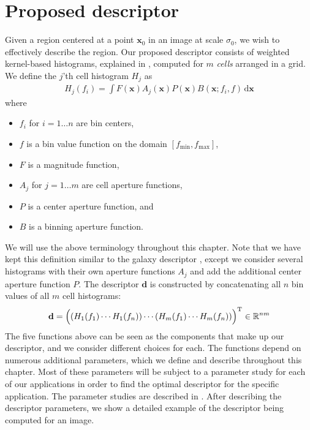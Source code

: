 \documentclass[thesis.tex]{subfiles}
\def\x{\mathbf{x}}
\def\d{\mathbf{d}}
\begin{document}
\chapter{Proposed descriptor}
%
Given a region centered at a point $\x_0$ in an image at scale $\sigma_0$, we wish to effectively describe the region. Our proposed descriptor consists of weighted kernel-based histograms, explained in , computed for $m$ \textit{cells} arranged in a grid. We define the $j$'th cell histogram $H_j$ as
%
\begin{align}
\label{eq:proposed_histogram}
H_j(f_i) = \int F(\x) A_j (\x) P (\x) B(\x; f_i,f) \,\text{d} \x
\end{align}
%
where
%
\begin{itemize}
\item[] $f_i$ for $i = 1 \dots n$ are bin centers,
\item[] $f$ is a bin value function on the domain $[f_\text{min},f_\text{max}]$,
\item[] $F$ is a magnitude function,
\item[] $A_j$ for $j = 1 \dots m$ are cell aperture functions,
\item[] $P$ is a center aperture function, and
\item[] $B$ is a binning aperture function.
\end{itemize}
%
We will use the above terminology throughout this chapter. Note that we have kept this definition similar to the galaxy descriptor \cite{pedersen2013shape}, except we consider several histograms with their own aperture functions $A_j$ and add the additional center aperture function $P$. The descriptor $\d$ is constructed by concatenating all $n$ bin values of all $m$ cell histograms:
%
\begin{align}
\label{eq:proposed_descriptor}
\d = \Bigl( \left(H_1(f_1) \cdots H_1(f_n)\right) \cdots (H_m(f_1) \cdots H_m(f_n)) \Bigr) ^\text{T}\in \mathbb{R}^{nm}
\end{align}
%
The five functions above can be seen as the components that make up our descriptor, and we consider different choices for each. The functions depend on numerous additional parameters, which we define and describe throughout this chapter. Most of these parameters will be subject to a parameter study for each of our applications in order to find the optimal descriptor for the specific application. The parameter studies are described in . After describing the descriptor parameters, we show a detailed example of the descriptor being computed for an image.
%
\end{document}
